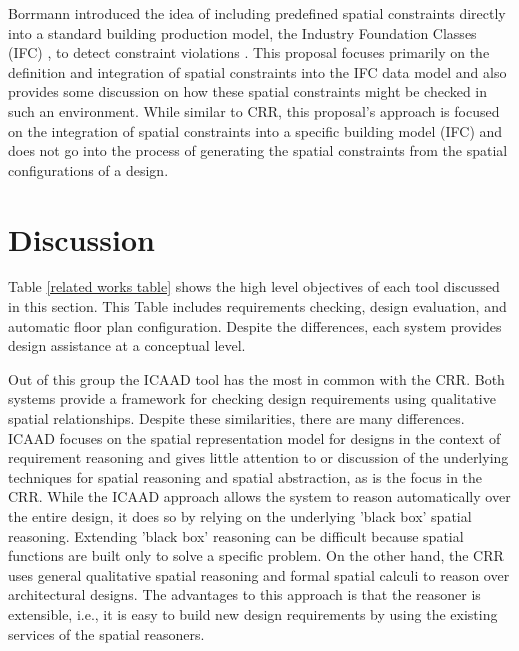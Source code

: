 \documentclass[12pt]{ucthesis}
\begin{document}
Borrmann introduced the idea of including predefined spatial constraints directly into a standard building production model, the Industry Foundation Classes (IFC) \cite{IFC}, to detect constraint violations \cite{Borrmann}. This proposal focuses primarily on the definition and integration of spatial constraints into the IFC data model and also provides some discussion on how these spatial constraints might be checked in such an environment. While similar to CRR, this proposal's approach is focused on the integration of spatial constraints into a specific building model (IFC) and does not go into the process of generating the spatial constraints from the spatial configurations of a design. 


\section{Discussion}
Table \ref{related works table} shows the high level objectives of each tool discussed in this section. This Table includes requirements checking, design evaluation, and automatic floor plan configuration. Despite the differences, each system provides design assistance at a conceptual level.

\begin{table}[H]
  \begin{center}
  \end{center}
\caption{Related Work System Objectives}
\label{related works table}
\end{table}   

Out of this group the ICAAD tool has the most in common with the CRR. Both systems provide a framework for checking design requirements using qualitative spatial relationships. Despite these similarities, there are many differences. ICAAD focuses on the spatial representation model for designs in the context of requirement reasoning and gives little attention to or discussion of the underlying techniques for spatial reasoning and spatial abstraction, as is the focus in the CRR. While the ICAAD approach allows the system to reason automatically over the entire design, it does so by relying on the underlying 'black box' spatial reasoning. Extending 'black box' reasoning can be difficult because spatial functions are built only to solve a specific problem. On the other hand, the CRR uses general qualitative spatial reasoning and formal spatial calculi to reason over architectural designs. The advantages to this approach is that the reasoner is extensible, i.e., it is easy to build new design requirements by using the existing services of the spatial reasoners.  
\end{document}
